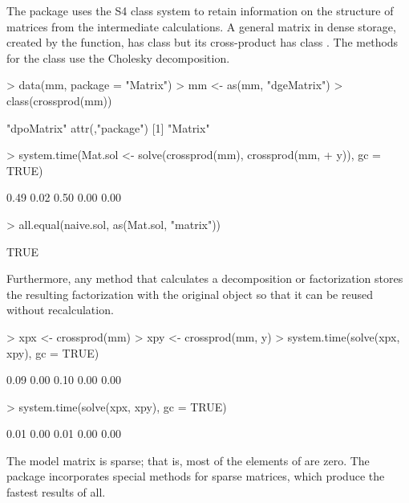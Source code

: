 \documentclass{article}
\begin{document}
The  package uses the S4 class system
\citep{R:Chambers:1998} to retain information on the structure of
matrices from the intermediate calculations.  A general matrix in
dense storage, created by the  function, has class
 but its cross-product has class .
The  methods for the  class use the
Cholesky decomposition.
\begin{Schunk}
\begin{Sinput}
> data(mm, package = "Matrix")
> mm <- as(mm, "dgeMatrix")
> class(crossprod(mm))
\end{Sinput}
\begin{Soutput}
[1] "dpoMatrix"
attr(,"package")
[1] "Matrix"
\end{Soutput}
\begin{Sinput}
> system.time(Mat.sol <- solve(crossprod(mm), crossprod(mm, 
+     y)), gc = TRUE)
\end{Sinput}
\begin{Soutput}
[1] 0.49 0.02 0.50 0.00 0.00
\end{Soutput}
\begin{Sinput}
> all.equal(naive.sol, as(Mat.sol, "matrix"))
\end{Sinput}
\begin{Soutput}
[1] TRUE
\end{Soutput}
\end{Schunk}

Furthermore, any method that calculates a
decomposition or factorization stores the resulting factorization with
the original object so that it can be reused without recalculation.
\begin{Schunk}
\begin{Sinput}
> xpx <- crossprod(mm)
> xpy <- crossprod(mm, y)
> system.time(solve(xpx, xpy), gc = TRUE)
\end{Sinput}
\begin{Soutput}
[1] 0.09 0.00 0.10 0.00 0.00
\end{Soutput}
\begin{Sinput}
> system.time(solve(xpx, xpy), gc = TRUE)
\end{Sinput}
\begin{Soutput}
[1] 0.01 0.00 0.01 0.00 0.00
\end{Soutput}
\end{Schunk}

The model matrix  is sparse; that is, most of the elements of
 are zero.  The  package incorporates special
methods for sparse matrices, which produce the fastest results of all.
\end{document}
